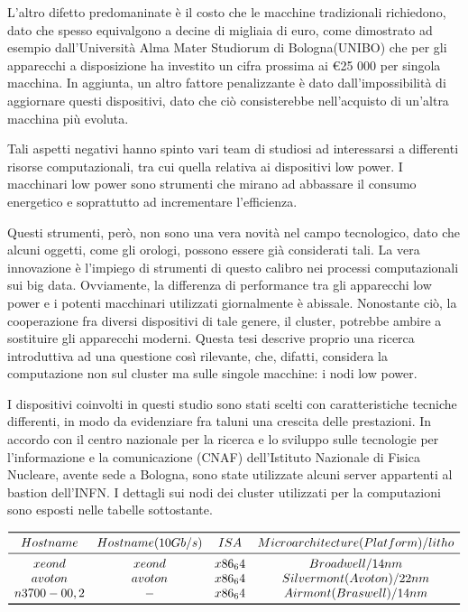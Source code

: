 L'altro difetto predomaninate è il costo che le macchine tradizionali richiedono, dato che spesso equivalgono a decine di migliaia di euro, come dimostrato ad esempio dall'Università Alma Mater Studiorum di Bologna(UNIBO) che per gli apparecchi a disposizione ha investito un cifra prossima ai €25 000 per singola macchina.
In aggiunta, un altro fattore penalizzante è dato dall'impossibilità di aggiornare questi dispositivi, dato che ciò consisterebbe nell'acquisto di un'altra macchina più evoluta.

Tali aspetti negativi hanno spinto vari team di studiosi ad interessarsi a differenti risorse computazionali, tra cui quella relativa ai dispositivi low power.
I macchinari low power sono strumenti che mirano ad abbassare il consumo energetico e soprattutto ad incrementare l'efficienza.

Questi strumenti, però, non sono una vera novità nel campo tecnologico, dato che alcuni oggetti, come gli orologi, possono essere già considerati tali.
La vera innovazione è l'impiego di strumenti di questo calibro nei processi computazionali sui big data.
Ovviamente, la differenza di performance tra gli apparecchi low power e i potenti macchinari utilizzati giornalmente è abissale.
Nonostante ciò, la cooperazione fra diversi dispositivi di tale genere, il cluster, potrebbe ambire a sostituire gli apparecchi moderni.
Questa tesi descrive proprio una ricerca introduttiva ad una questione così rilevante, che, difatti, considera la computazione non sul cluster ma sulle singole macchine: i nodi low power.

I dispositivi coinvolti in questi studio sono stati scelti con caratteristiche tecniche differenti, in modo da evidenziare fra taluni una crescita delle prestazioni.
In accordo con il centro nazionale per la ricerca e lo sviluppo sulle tecnologie per l'informazione e la comunicazione (CNAF) dell'Istituto Nazionale di Fisica Nucleare, avente sede a Bologna, sono state utilizzate alcuni server appartenti al bastion dell'INFN.
I dettagli sui nodi dei cluster utilizzati per la computazioni sono esposti nelle tabelle sottostante.
\begin{table}
\centering
$\begin{array}{*{4}{c}}
	\toprule
		Hostname & Hostname(10Gb/s) & ISA & Microarchitecture(Platform)/litho \\
	\midrule
		xeond & xeond & x86_64 & Broadwell/14nm \\
		avoton & avoton & x86_64 & Silvermont(Avoton)/22nm \\
		n3700-0{0,2} & - & x86_64 & Airmont(Braswell)/14nm \\
	\bottomrule
\end{array}$
\caption{}
\end{table}

